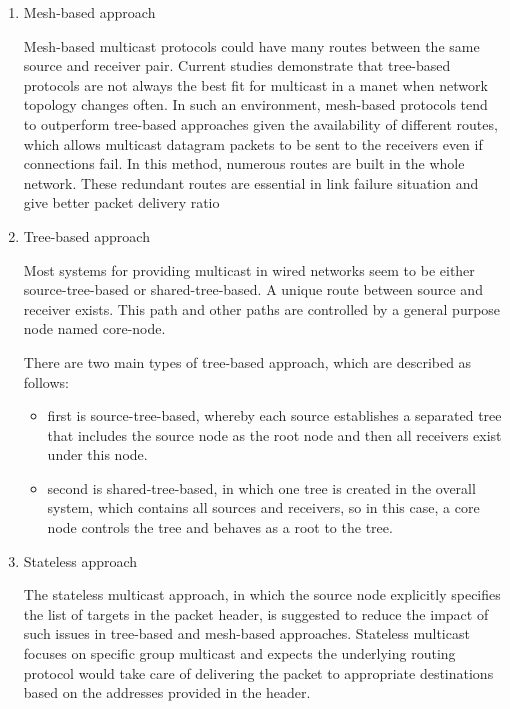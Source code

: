 \begin{enumerate}
\item Mesh-based approach

Mesh-based multicast protocols could have many routes between the same source and receiver pair. Current studies demonstrate that tree-based protocols are not always the best fit for multicast in a \acrshort{manet} when network topology changes often. In such an environment, mesh-based protocols tend to outperform tree-based approaches given the availability of different routes, which allows multicast datagram packets to be sent to the receivers even if connections fail. In this method, numerous routes are built in the whole network. These redundant routes are essential in link failure situation and give better packet delivery ratio 

\item Tree-based approach

Most systems for providing multicast in wired networks seem to be either source-tree-based or shared-tree-based. A unique route between source and receiver exists. This path and other paths are controlled by a general purpose node named core-node.

There are two main types of tree-based approach, which are described as follows:

\begin{itemize}
\item first is source-tree-based, whereby each source establishes a separated tree that includes the source node as the root node and then all receivers exist under this node.
\item second is shared-tree-based, in which one tree is created in the overall system, which contains all sources and receivers, so in this case, a core node controls the tree and behaves as a root to the tree.
\end{itemize}

\item Stateless approach

The stateless multicast approach, in which the source node explicitly specifies the list of targets in the packet header, is suggested to reduce the impact of such issues in tree-based and mesh-based approaches. Stateless multicast focuses on specific group multicast and expects the underlying routing protocol would take care of delivering the packet to appropriate destinations based on the addresses provided in the header.
\end{enumerate}

